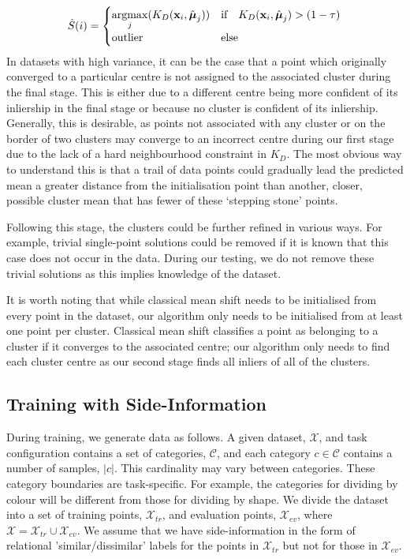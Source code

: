 \documentclass[../thesis.tex]{subfiles}
\begin{document}
\begin{equation}
    \hat{S}(i) =
    \begin{cases}
       \underset{j}{\mathrm{argmax}} 
       (K_D(\mathbf{x}_i, \hat{\boldsymbol{\mu}}_j)) & \text{if\hspace{1em}} K_D(\mathbf{x}_i, \hat{\boldsymbol{\mu}}_j) > (1 - \tau) \\
      \text{outlier} & \text{else}
    \end{cases}
\end{equation}
In datasets with high variance, it can be the case that a point which originally converged to a particular centre is not assigned to the associated cluster during the final stage. This is either due to a different centre being more confident of its inliership in the final stage or because no cluster is confident of its inliership. 
Generally, this is desirable, as points not associated with any cluster or on the border of two clusters may converge to an incorrect centre during our first stage due to the lack of a hard neighbourhood constraint in $K_D$.
The most obvious way to understand this is that a trail of data points could gradually lead the predicted mean a greater distance from the initialisation point than another, closer, possible cluster mean that has fewer of these `stepping stone' points.

Following this stage, the clusters could be further refined in various ways. For example, trivial single-point solutions could be removed if it is known that this case does not occur in the data. During our testing, we do not remove these trivial solutions as this implies knowledge of the dataset.

It is worth noting that while classical mean shift needs to be initialised from every point in the dataset, our algorithm only needs to be initialised from at least one point per cluster. Classical mean shift classifies a point as belonging to a cluster if it converges to the associated centre;
our algorithm only needs to find each cluster centre as our second stage finds all inliers of all of the clusters.

\subsection{Training with Side-Information}
During training, we generate data as follows.
A given dataset, $\mathcal X$,  and task configuration contains a set of categories, $\mathcal C$, and each category $c\in\mathcal C$ contains a number of samples, $|c|$. 
This cardinality may vary between categories. 
These category boundaries are task-specific. For example, the categories for dividing by colour will be different from those for dividing by shape.
We divide the dataset into a set of training points, $\mathcal{X}_{tr}$, and evaluation points, $\mathcal{X}_{ev}$, where $\mathcal{X} = \mathcal{X}_{tr} \cup \mathcal{X}_{ev}$. 
We assume that we have side-information in the form of relational 'similar/dissimilar' labels for the points in $\mathcal{X}_{tr}$ but not for those in $\mathcal{X}_{ev}$. 
\end{document}
